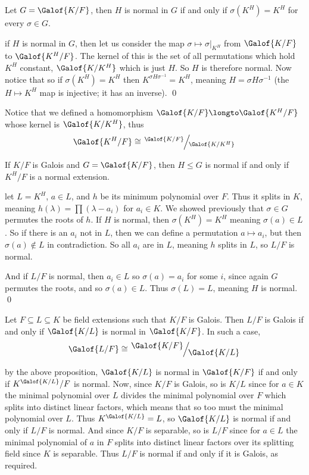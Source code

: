 \bcoro

    Let $G=\Galof{K/F}$, then $H$ is normal in $G$ if and only if $\sigma(K^H)=K^H$ for every $\sigma\in G$.

\ecoro

\Proof if $H$ is normal in $G$, then let us consider the map $\sigma\mapsto\sigma\bigl|_{K^H}$ from $\Galof{K/F}$ to $\Galof{K^H/F}$.
The kernel of this is the set of all permutations which hold $K^H$ constant, $\Galof{K/K^H}$ which is just $H$.
So $H$ is therefore normal.
Now notice that
so if $\sigma(K^H)=K^H$ then $K^{\sigma H\sigma^{-1}}=K^H$, meaning $H=\sigma H\sigma^{-1}$ (the $H\mapsto K^H$ map is injective; it has an inverse).
\qed

Notice that we defined a homomorphism $\Galof{K/F}\longto\Galof{K^H/F}$ whose kernel is $\Galof{K/K^H}$, thus
$$ \Galof{K^H/F} \cong \slfrac{\Galof{K/F}}{\Galof{K/K^H}} $$

\bprop

    If $K/F$ is Galois and $G=\Galof{K/F}$, then $H\leq G$ is normal if and only if $K^H/F$ is a normal extension.

\eprop

\Proof let $L=K^H$, $a\in L$, and $h$ be its minimum polynomial over $F$.
Thus it splits in $K$, meaning $h(\lambda)=\prod(\lambda-a_i)$ for $a_i\in K$.
We showed previously that $\sigma\in G$ permutes the roots of $h$.
If $H$ is normal, then $\sigma(K^H)=K^H$ meaning $\sigma(a)\in L$.
So if there is an $a_i$ not in $L$, then we can define a permutation $a\mapsto a_i$, but then $\sigma(a)\notin L$ in contradiction.
So all $a_i$ are in $L$, meaning $h$ splits in $L$, so $L/F$ is normal.

And if $L/F$ is normal, then $a_i\in L$ so $\sigma(a)=a_i$ for some $i$, since again $G$ permutes the roots, and so $\sigma(a)\in L$.
Thus $\sigma(L)=L$, meaning $H$ is normal.
\qed

\bprop

    Let $F\subseteq L\subseteq K$ be field extensions such that $K/F$ is Galois.
    Then $L/F$ is Galois if and only if $\Galof{K/L}$ is normal in $\Galof{K/F}$.
    In such a case,
    $$ \Galof{L/F} \cong \slfrac{\textstyle\Galof{K/F}}{\textstyle\Galof{K/L}} $$

\eprop

\Proof by the above proposition, $\Galof{K/L}$ is normal in $\Galof{K/F}$ if and only if $K^{\Galof{K/L}}/F$ is normal.
Now, since $K/F$ is Galois, so is $K/L$ since for $a\in K$ the minimal polynomial over $L$ divides the minimal polynomial over $F$ which splits into distinct linear factors, which means that so too must the
minimal polynomial over $L$.
Thus $K^{\Galof{K/L}}=L$, so $\Galof{K/L}$ is normal if and only if $L/F$ is normal.
And since $K/F$ is separable, so is $L/F$ since for $a\in L$ the minimal polynomial of $a$ in $F$ splits into distinct linear factors over its splitting field since $K$ is separable.
Thus $L/F$ is normal if and only if it is Galois, as required.


